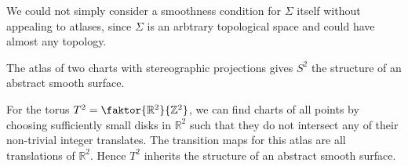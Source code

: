 \begin{remark}
	We could not simply consider a smoothness condition for \( \Sigma \) itself without appealing to atlases, since \( \Sigma \) is an arbtrary topological space and could have almost any topology.
\end{remark}
\begin{example}
	The atlas of two charts with stereographic projections gives \( S^2 \) the structure of an abstract smooth surface.

	For the torus \( T^2 = \faktor{\mathbb R^2}{\mathbb Z^2} \), we can find charts of all points by choosing sufficiently small disks in \( \mathbb R^2 \) such that they do not intersect any of their non-trivial integer translates.
	The transition maps for this atlas are all translations of \( \mathbb R^2 \).
	Hence \( T^2 \) inherits the structure of an abstract smooth surface.
\end{example}
